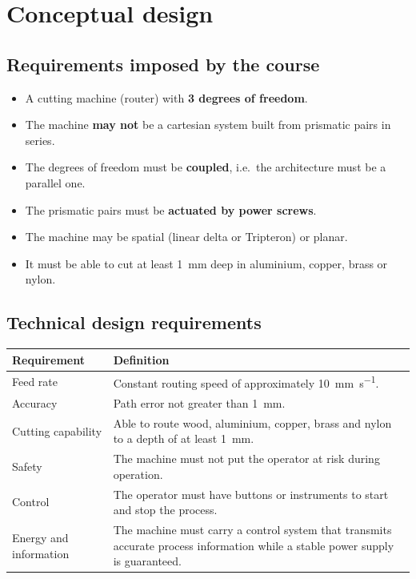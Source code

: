\documentclass[11pt]{article}
\begin{document}
\section{Conceptual design}

\subsection{Requirements imposed by the course}

\begin{itemize}[leftmargin=*,nosep]
  \item A cutting machine (router) with \textbf{3 degrees of freedom}.
  \item The machine \textbf{may not} be a cartesian system built from prismatic pairs in
        series.
  \item The degrees of freedom must be \textbf{coupled}, i.e.\ the architecture must be a
        parallel one.
  \item The prismatic pairs must be \textbf{actuated by power screws}.
  \item The machine may be spatial (linear delta or Tripteron) or planar.
  \item It must be able to cut at least \SI{1}{\milli\metre} deep in aluminium, copper,
        brass or nylon.
\end{itemize}

\subsection{Technical design requirements}

\begin{center}
\begin{tabular}{@{}l>{\raggedright\arraybackslash}p{10.4cm}@{}}
\toprule
\textbf{Requirement} & \textbf{Definition} \\
\midrule
Feed rate   & Constant routing speed of approximately \SI{10}{\milli\metre\per\second}. \\
Accuracy    & Path error not greater than \SI{1}{\milli\metre}. \\
Cutting capability & Able to route wood, aluminium, copper, brass and nylon to a depth of at least \SI{1}{\milli\metre}. \\
Safety      & The machine must not put the operator at risk during operation. \\
Control     & The operator must have buttons or instruments to start and stop the process. \\
Energy and information & The machine must carry a control system that transmits accurate
              process information while a stable power supply is guaranteed. \\
\bottomrule
\end{tabular}
\end{center}
\end{document}
